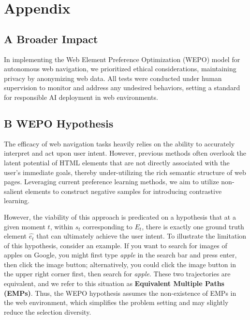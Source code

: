 \documentclass{article}
\begin{document}
\newpage



\newpage

\section*{Appendix} 

\subsection*{A Broader Impact}
\label{sec:appendix_a}

In implementing the Web Element Preference Optimization (WEPO) model for autonomous web navigation, we prioritized ethical considerations, maintaining privacy by anonymizing web data. All tests were conducted under human supervision to monitor and address any undesired behaviors, setting a standard for responsible AI deployment in web environments.

\subsection*{B WEPO Hypothesis}
\label{sec:hypo}

The efficacy of web navigation tasks heavily relies on the ability to accurately interpret and act upon user intent. However, previous methods often overlook the latent potential of HTML elements that are not directly associated with the user’s immediate goals, thereby under-utilizing the rich semantic structure of web pages. Leveraging current preference learning methods, we aim to utilize non-salient elements to construct negative samples for introducing contrastive learning.

However, the viability of this approach is predicated on a hypothesis that at a given moment \( t \), within \( s_t \) corresponding to \( E_t \), there is exactly one ground truth element \( \hat{e_t} \) that can ultimately achieve the user intent. To illustrate the limitation of this hypothesis, consider an example. If you want to search for images of apples on Google, you might first type \textit{apple} in the search bar and press enter, then click the image button; alternatively, you could click the image button in the upper right corner first, then search for \textit{apple}. These two trajectories are equivalent, and we refer to this situation as \textbf{Equivalent Multiple Paths (EMPs)}. Thus, the WEPO hypothesis assumes the non-existence of EMPs in the web environment, which simplifies the problem setting and may slightly reduce the selection diversity.
\end{document}
